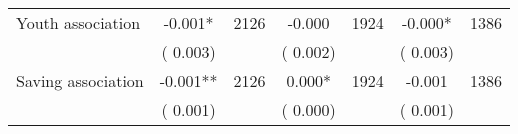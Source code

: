 \begin{tabular}{l*{6}{c}}
Youth association        &             -0.001*      &       2126       &             -0.000      &       1924       &             -0.000*      &       1386       \\
                       &       (       0.003)            &                               &       (       0.002)            &                               &       (       0.003)            &                               \\
Saving association        &             -0.001**      &       2126       &              0.000*      &       1924       &             -0.001      &       1386       \\
                       &       (       0.001)            &                               &       (       0.000)            &                               &       (       0.001)            &                               \\
\hline \end{tabular}
